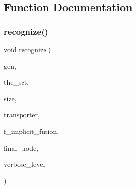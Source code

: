 \subsection{Function Documentation}
\mbox{\label{recognize_8_c_ade3d93a01c9f55023b0050a9f7cd6189}} 
\subsubsection{\texorpdfstring{recognize()}{recognize()}}
{\footnotesize\ttfamily void recognize (\begin{DoxyParamCaption}\item[{\mbox{\hyperlink{classgenerator}{generator}} $\ast$}]{gen,  }\item[{\mbox{\hyperlink{galois_8h_a09fddde158a3a20bd2dcadb609de11dc}{I\+NT}} $\ast$}]{the\+\_\+set,  }\item[{\mbox{\hyperlink{galois_8h_a09fddde158a3a20bd2dcadb609de11dc}{I\+NT}}}]{size,  }\item[{\mbox{\hyperlink{galois_8h_a09fddde158a3a20bd2dcadb609de11dc}{I\+NT}} $\ast$}]{transporter,  }\item[{\mbox{\hyperlink{galois_8h_a09fddde158a3a20bd2dcadb609de11dc}{I\+NT}}}]{f\+\_\+implicit\+\_\+fusion,  }\item[{\mbox{\hyperlink{galois_8h_a09fddde158a3a20bd2dcadb609de11dc}{I\+NT}} \&}]{final\+\_\+node,  }\item[{\mbox{\hyperlink{galois_8h_a09fddde158a3a20bd2dcadb609de11dc}{I\+NT}}}]{verbose\+\_\+level }\end{DoxyParamCaption})}

\mbox{\label{recognize_8_c_a08d856f7a06178e6ea5f6c27f6a7b6e2}} 
